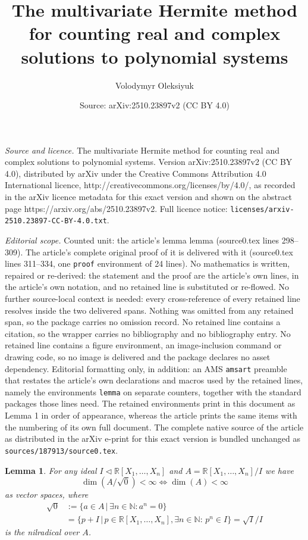 \documentclass[10pt,a4paper]{amsart}
\title{The multivariate Hermite method for counting real and complex solutions to polynomial systems}
\author{Volodymyr Oleksiyuk}
\date{Source: arXiv:2510.23897v2 (CC BY 4.0)}
\newtheorem{lemma}{Lemma}
\begin{document}
\maketitle

\noindent\emph{Source and licence.} The multivariate Hermite method for counting real and complex solutions to polynomial systems. Version arXiv:2510.23897v2 (CC BY 4.0), distributed by arXiv under the Creative Commons Attribution 4.0 International licence, http://creativecommons.org/licenses/by/4.0/, as recorded in the arXiv licence metadata for this exact version and shown on the abstract page https://arxiv.org/abs/2510.23897v2. Full licence notice: \texttt{licenses/arxiv-2510.23897-CC-BY-4.0.txt}.\par\smallskip

\noindent\textit{Editorial scope.} Counted unit: the article's lemma lemma (source0.tex lines 298--309). The article's complete original proof of it is delivered with it (source0.tex lines 311--334, one \texttt{proof} environment of 24 lines). No mathematics is written, repaired or re-derived: the statement and the proof are the article's own lines, in the article's own notation, and no retained line is substituted or re-flowed.  No further source-local context is needed: every cross-reference of every retained line resolves inside the two delivered spans.  Nothing was omitted from any retained span, so the package carries no omission record.  No retained line contains a citation, so the wrapper carries no bibliography and no bibliography entry.  No retained line contains a figure environment, an image-inclusion command or drawing code, so no image is delivered and the package declares no asset dependency.  Editorial formatting only, in addition: an AMS \texttt{amsart} preamble that restates the article's own declarations and macros used by the retained lines, namely the environments \texttt{lemma} on separate counters, together with the standard packages those lines need.  The retained environments print in this document as Lemma 1 in order of appearance, whereas the article prints the same items with the numbering of its own full document.  The complete native source of the article as distributed in the arXiv e-print for this exact version is bundled unchanged as \texttt{sources/187913/source0.tex}.
\begin{lemma}
For any ideal $I \triangleleft \mathbb{R}[X_1, \ldots , X_n]$ and $A = \mathbb{R}[X_1, \ldots , X_n]/I$ we have
\[
\dim(A/\sqrt{0})<\infty \Leftrightarrow \dim(A)<\infty
\]
as vector spaces, where 
\begin{align*}
    \sqrt{0}&:=\{a \in A \, | \, \exists n \in \mathbb{N}: a^n = 0\} \\
    &= \{ p+I \, | \, p \in \mathbb{R}[X_1, \ldots , X_n], \exists n \in \mathbb{N}: \, p^n \in I\} = \sqrt{I}/I
\end{align*}
is the nilradical over $A$.
\end{lemma}
\end{document}
